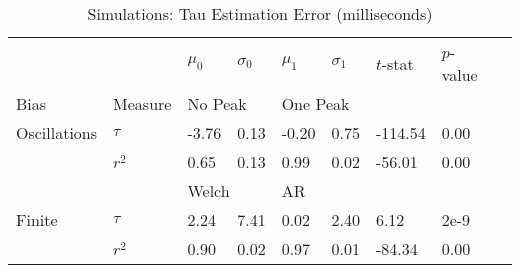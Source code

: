 \documentclass{article}
\begin{document}
\begin{table}[ht]

\centering
\caption{Simulations: Tau Estimation Error (milliseconds)}

\begin{tabular}{
    p{}
    p{}
    p{}
    p{}
    p{}
    p{}
    p{}
    p{}
    p{}
}

\toprule

&  &
$\mu_{0}$  &
$\sigma_{0}$ &
$\mu_{1}$  &
$\sigma_{1}$ &
$t$-stat &
$p$-value \\


\cmidrule(lr){3-3}
\cmidrule(lr){4-4}
\cmidrule(lr){5-5}
\cmidrule(lr){6-6}
\cmidrule(lr){7-7}
\cmidrule(lr){8-8}

Bias & Measure &
\multicolumn{2}{l}{No Peak} &
\multicolumn{2}{l}{One Peak} \\

\cmidrule(lr){2-2}
\cmidrule(lr){3-4}
\cmidrule(lr){5-6}

Oscillations  & $\tau$  & -3.76 & 0.13 & -0.20 & 0.75 & -114.54 & 0.00 \\
              & $r^{2}$ &  0.65 & 0.13 &  0.99 & 0.02 &  -56.01 & 0.00 \\
\addlinespace

& &
\multicolumn{2}{l}{Welch} &
\multicolumn{2}{l}{AR} \\
\cmidrule(lr){3-4}
\cmidrule(lr){5-6}

Finite        & $\tau$  & 2.24 & 7.41 & 0.02 & 2.40 &   6.12 & 2e-9 \\
              & $r^{2}$ & 0.90 & 0.02 & 0.97 & 0.01 & -84.34 & 0.00 \\
\bottomrule

\end{tabular}
\end{table}
\end{document}

